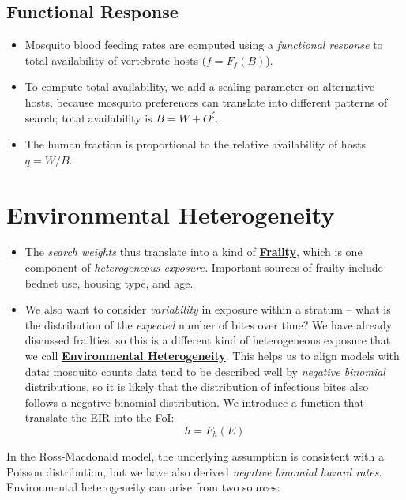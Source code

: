 \documentclass[
]{book}
\begin{document}
\hypertarget{functional-response}{%
\subsection{Functional Response}\label{functional-response}}

\begin{itemize}
\item
  Mosquito blood feeding rates are computed using a \emph{functional response} to total availability of vertebrate hosts (\(f = F_f(B)\)).
\item
  To compute total availability, we add a scaling parameter on alternative hosts, because mosquito preferences can translate into different patterns of search; total availability is \(B=W + O^\zeta\).
\item
  The human fraction is proportional to the relative availability of hosts \(q = W/B\).
\end{itemize}

\hypertarget{environmental-heterogeneity}{%
\section{Environmental Heterogeneity}\label{environmental-heterogeneity}}

\begin{itemize}
\item
  The \emph{search weights} thus translate into a kind of \textbf{\protect\hyperlink{frailty}{Frailty}}, which is one component of \emph{heterogeneous exposure.} Important sources of frailty include bednet use, housing type, and age.
\item
  We also want to consider \emph{variability} in exposure within a stratum -- what is the distribution of the \emph{expected} number of bites over time? We have already discussed frailties, so this is a different kind of heterogeneous exposure that we call \textbf{\protect\hyperlink{environmental-heterogeneity}{Environmental Heterogeneity}}. This helps us to align models with data: mosquito counts data tend to be described well by \emph{negative binomial} distributions, so it is likely that the distribution of infectious bites also follows a negative binomial distribution. We introduce a function that translate the EIR into the FoI:
  \[h=F_h(E)\]
\end{itemize}

In the Ross-Macdonald model, the underlying assumption is consistent with a Poisson distribution, but we have also derived \emph{negative binomial hazard rates}. Environmental heterogeneity can arise from two sources:
\end{document}
